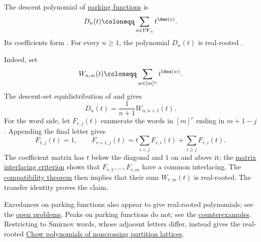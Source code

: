 \begin{example*}

The descent polynomial of \hyperref[parkingFunctions]{parking functions} is
\[
 D_n(t) \coloneqq \sum_{a\in\mathrm{PF}_n}t^{\des(a)}.
\]
Its coefficients form .  For every $n\geq 1$, the polynomial
$D_n(t)$ is real-rooted \cite[Cor.~7.1]{Alexandersson2026ParkingSmirnov}.
\label{parkingFunctionDescentsRealRooted}

Indeed, set
\[
 W_{n,m}(t) \coloneqq \sum_{w\in[m]^n}t^{\des(w)}.
\]
The descent-set equidistribution of  and
 \cite[Thm.~8]{DiaconisHicks2017} gives
\[
 D_n(t)=\frac{1}{n+1}W_{n,n+1}(t).
\]
For the word side, let $F_{r,j}(t)$ enumerate the words in $[m]^r$ ending in
$m+1-j$.  Appending the final letter gives
\[
 F_{1,j}(t)=1,\qquad
 F_{r+1,j}(t)
 =t\sum_{i<j}F_{r,i}(t)+\sum_{i\geq j}F_{r,i}(t).
\]
The coefficient matrix has $t$ below the diagonal and $1$ on and above it;
the \hyperref[matrixPreservesInterlacingSequences]{matrix interlacing
criterion} shows that $F_{r,1},\dotsc,F_{r,m}$ have a common interlacing.
The \hyperref[commonInterlacingCompatibilityTheorem]{compatibility theorem}
then implies that their sum $W_{r,m}(t)$ is real-rooted.  The transfer identity
proves the claim.

Excedances on parking functions also appear to give real-rooted
polynomials; see the \hyperref[conjParkingExcedances]{open problems}.  Peaks
on parking functions do not; see the
\hyperref[counterexamplesParkingPeaks]{counterexamples}.
Restricting to Smirnov words, whose adjacent letters differ, instead gives the
real-rooted \hyperref[noncrossingChowPolynomial]{Chow polynomials of
noncrossing partition lattices}.
\end{example*}

